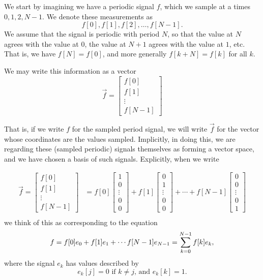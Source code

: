 \documentclass[12pt]{report}
\theoremstyle{plain}
\begin{document}
We start by imagining we have a periodic signal $f$, which we sample at a times $0, 1, 2, N-1$. We denote these measurements as
\[ f[0], f[1], f[2], \ldots, f[N-1]. \]
We assume that the signal is periodic with period $N$, so that the value at $N$ agrees with the value at $0$, the value at $N+1$ agrees with the value at $1$, etc. That is, we have $f[N] = f[0]$, and more generally $f[k + N] = f[k]$ for all $k$.

We may write this information as a vector
\[ 
\vec f = 
\left[
\begin{matrix}
f[0] \\
f[1] \\
\vdots \\
f[N-1]	
\end{matrix}
\right]
\]

That is, if we write $f$ for the sampled period signal, we will write $\vec f$ for the vector whose coordinates are the values sampled.
Implicitly, in doing this, we are regarding these (sampled periodic) signals themselves as forming a vector space, and we have chosen a basis of such signals. Explicitly, when we write

\begin{align*}
\vec f = 
\left[
\begin{matrix}
f[0] \\
f[1] \\
\vdots \\
f[N-1]	
\end{matrix}
\right]
&=
f[0]
\left[
\begin{matrix}
1 \\
0 \\
\vdots \\
0 \\
0	
\end{matrix}
\right]
+
f[1]
\left[
\begin{matrix}
0 \\
1 \\
\vdots \\
0 \\
0	
\end{matrix}
\right]
+ 
\cdots
+
f[N-1]
\left[
\begin{matrix}
0 \\
0 \\
\vdots \\
0 \\
1
\end{matrix}
\right] \\
\end{align*}
we think of this as corresponding to the equation
\[f = f[0]e_0 + f[1] e_1 + \cdots f[N-1]e_{N-1}\\
= \sum_{k = 0}^{N-1} f[k] e_k,
\]
where the signal $e_k$ has values described by
\[ e_k[j] = 0 \text{ if $k \neq j$, and } e_k[k] = 1. \]
\end{document}
